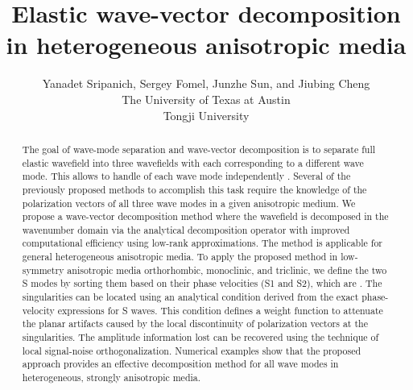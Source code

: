 
\title{Elastic wave-vector decomposition in heterogeneous anisotropic media}
\author{Yanadet Sripanich\footnotemark[1], Sergey Fomel\footnotemark[1], Junzhe Sun\footnotemark[1], and Jiubing Cheng\footnotemark[2] \\
\footnotemark[1] The University of Texas at Austin \\
\footnotemark[2] Tongji University}
\maketitle
\address{
Bureau of Economic Geology \\
John A. and Katherine G. Jackson School of Geosciences \\
The University of Texas at Austin \\
University Station, Box X \\
Austin, TX 78713-8924 \\
\nolinkurl{sripanichy@utexas.edu}
}

\begin{abstract}
The goal of wave-mode separation and wave-vector decomposition is to separate full elastic wavefield into three wavefields with each corresponding to a different wave mode.
This allows  to handle of each wave mode independently .
Several of the previously proposed methods to accomplish this task require the knowledge of the polarization vectors
of all three wave modes in a given anisotropic medium. We propose a wave-vector decomposition method where the wavefield is decomposed in the wavenumber domain via the analytical decomposition operator with improved computational efficiency using low-rank approximations. The method is applicable for general heterogeneous anisotropic media. To apply the proposed method in low-symmetry anisotropic media  orthorhombic, monoclinic, and triclinic, we define the two S modes by sorting them based on their phase velocities (S1 and S2), which are . The singularities can be located using an analytical condition derived from the exact phase-velocity expressions for S waves. This condition defines a weight function to attenuate the planar artifacts caused by the local discontinuity of polarization vectors at the singularities. The amplitude information lost  can be recovered using the technique of local signal-noise orthogonalization. Numerical examples show that the proposed approach provides an effective decomposition method for all wave modes in heterogeneous, strongly anisotropic media.
\end{abstract}

